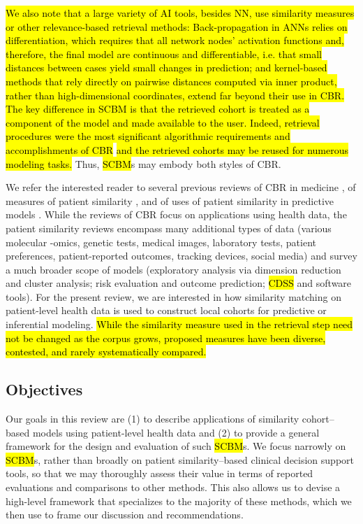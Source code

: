 \documentclass[sn-mathphys,Numbered,pdflatex]{sn-jnl}
\theoremstyle{remark}
\theoremstyle{definition}
\begin{document}
\hl{We also note that a large variety of AI tools, besides NN, use similarity measures or other relevance-based retrieval methods: Back-propagation in ANNs relies on differentiation, which requires that all network nodes' activation functions and, therefore, the final model are continuous and differentiable, i.e. that small distances between cases yield small changes in prediction; and kernel-based methods that rely directly on pairwise distances computed via inner product, rather than high-dimensional coordinates, extend far beyond their use in CBR. The key difference in SCBM is that the retrieved cohort is treated as a component of the model and made available to the user. Indeed, retrieval procedures were the most significant algorithmic requirements and accomplishments of CBR }\citep{Kolodner1992, Gierl1998}\hl{ and the retrieved cohorts may be reused for numerous modeling tasks.}
Thus, \hl{SCBM}s may embody both styles of CBR.

We refer the interested reader to several previous reviews of CBR in
medicine \citep{Gierl1998, Begum2011, Choudhury2016}, of measures of
patient similarity \citep{Dai2020}, and of uses of patient similarity in
predictive models \citep{Welch2013, Sharafoddini2017, Parimbelli2018}.
While the reviews of CBR focus on applications using health data, the
patient similarity reviews encompass many additional types of data
(various molecular -omics, genetic tests, medical images, laboratory
tests, patient preferences, patient-reported outcomes, tracking devices,
social media) and survey a much broader scope of models (exploratory
analysis via dimension reduction and cluster analysis; risk evaluation
and outcome prediction; \hl{CDSS} and software tools). For the present
review, we are interested in how similarity matching on patient-level
health data is used to construct local cohorts for predictive or
inferential
modeling.\hl{ While the similarity measure used in the retrieval step need not be changed as the corpus grows, proposed measures have been diverse, contested, and rarely systematically compared.}

\subsection{Objectives}\label{objectives}

Our goals in this review are (1) to describe applications of similarity
cohort--based models using patient-level health data and (2) to provide
a general framework for the design and evaluation of such \hl{SCBM}s. We
focus narrowly on \hl{SCBM}s, rather than broadly on patient
similarity--based clinical decision support tools, so that we may
thoroughly assess their value in terms of reported evaluations and
comparisons to other methods. This also allows us to devise a high-level
framework that specializes to the majority of these methods, which we
then use to frame our discussion and recommendations.
\end{document}
